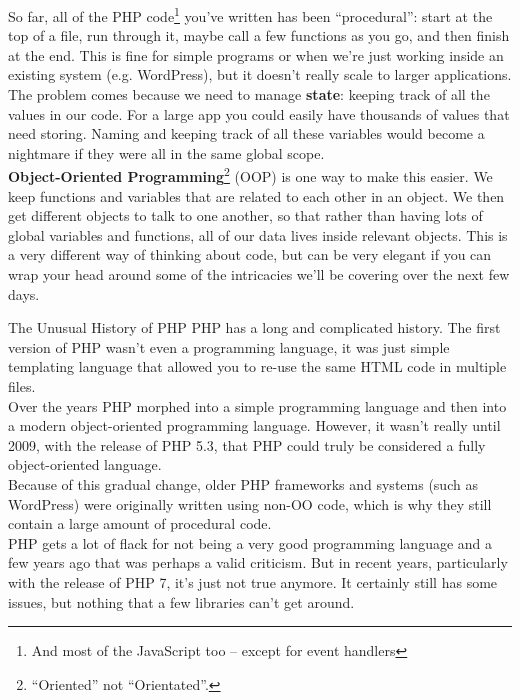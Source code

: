 So far, all of the PHP code\footnote{And most of the JavaScript too – except for event handlers} you've written has been ``procedural'': start at the top of a file, run through it, maybe call a few functions as you go, and then finish at the end. This is fine for simple programs or when we're just working inside an existing system (e.g. WordPress), but it doesn't really scale to larger applications.
\\

The problem comes because we need to manage \textbf{state}: keeping track of all the values in our code. For a large app you could easily have thousands of values that need storing. Naming and keeping track of all these variables would become a nightmare if they were all in the same global scope.
\\

\textbf{Object-Oriented Programming}\footnote{``Oriented'' not ``Orientated''.} (OOP) is one way to make this easier. We keep functions and variables that are related to each other in an object. We then get different objects to talk to one another, so that rather than having lots of global variables and functions, all of our data lives inside relevant objects. This is a very different way of thinking about code, but can be very elegant if you can wrap your head around some of the intricacies we'll be covering over the next few days.

\pagebreak

\begin{infobox}{The Unusual History of PHP}
    PHP has a long and complicated history. The first version of PHP wasn't even a programming language, it was just simple templating language that allowed you to re-use the same HTML code in multiple files.
    \\

    Over the years PHP morphed into a simple programming language and then into a modern object-oriented programming language. However, it wasn't really until 2009, with the release of PHP 5.3, that PHP could truly be considered a fully object-oriented language.
    \\

    Because of this gradual change, older PHP frameworks and systems (such as WordPress) were originally written using non-OO code, which is why they still contain a large amount of procedural code.
    \\

    PHP gets a lot of flack for not being a very good programming language and a few years ago that was perhaps a valid criticism. But in recent years, particularly with the release of PHP 7, it's just not true anymore. It certainly still has some issues, but nothing that a few libraries can't get around.

\end{infobox}

